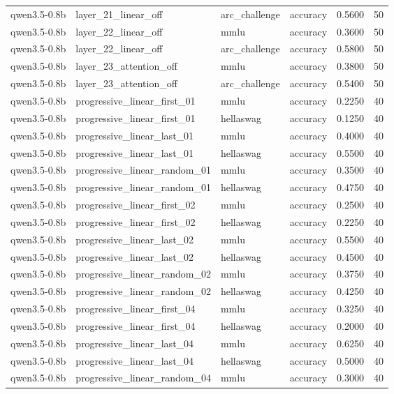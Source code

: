 \begin{tabular}{llllrr}
qwen3.5-0.8b & layer_21_linear_off & arc_challenge & accuracy & 0.5600 & 50 \\
qwen3.5-0.8b & layer_22_linear_off & mmlu & accuracy & 0.3600 & 50 \\
qwen3.5-0.8b & layer_22_linear_off & arc_challenge & accuracy & 0.5800 & 50 \\
qwen3.5-0.8b & layer_23_attention_off & mmlu & accuracy & 0.3800 & 50 \\
qwen3.5-0.8b & layer_23_attention_off & arc_challenge & accuracy & 0.5400 & 50 \\
qwen3.5-0.8b & progressive_linear_first_01 & mmlu & accuracy & 0.2250 & 40 \\
qwen3.5-0.8b & progressive_linear_first_01 & hellaswag & accuracy & 0.1250 & 40 \\
qwen3.5-0.8b & progressive_linear_last_01 & mmlu & accuracy & 0.4000 & 40 \\
qwen3.5-0.8b & progressive_linear_last_01 & hellaswag & accuracy & 0.5500 & 40 \\
qwen3.5-0.8b & progressive_linear_random_01 & mmlu & accuracy & 0.3500 & 40 \\
qwen3.5-0.8b & progressive_linear_random_01 & hellaswag & accuracy & 0.4750 & 40 \\
qwen3.5-0.8b & progressive_linear_first_02 & mmlu & accuracy & 0.2500 & 40 \\
qwen3.5-0.8b & progressive_linear_first_02 & hellaswag & accuracy & 0.2250 & 40 \\
qwen3.5-0.8b & progressive_linear_last_02 & mmlu & accuracy & 0.5500 & 40 \\
qwen3.5-0.8b & progressive_linear_last_02 & hellaswag & accuracy & 0.4500 & 40 \\
qwen3.5-0.8b & progressive_linear_random_02 & mmlu & accuracy & 0.3750 & 40 \\
qwen3.5-0.8b & progressive_linear_random_02 & hellaswag & accuracy & 0.4250 & 40 \\
qwen3.5-0.8b & progressive_linear_first_04 & mmlu & accuracy & 0.3250 & 40 \\
qwen3.5-0.8b & progressive_linear_first_04 & hellaswag & accuracy & 0.2000 & 40 \\
qwen3.5-0.8b & progressive_linear_last_04 & mmlu & accuracy & 0.6250 & 40 \\
qwen3.5-0.8b & progressive_linear_last_04 & hellaswag & accuracy & 0.5000 & 40 \\
qwen3.5-0.8b & progressive_linear_random_04 & mmlu & accuracy & 0.3000 & 40 \\

\end{tabular}
